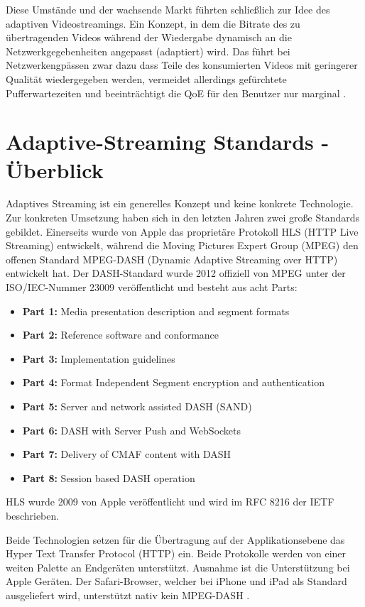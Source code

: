 \documentclass[paper = a4, fontsize = 12pt, parskip = half]{scrartcl} %
\begin{document}
Diese Umstände und der wachsende Markt führten schließlich zur Idee des adaptiven Videostreamings. Ein Konzept, in dem die Bitrate des zu übertragenden Videos während der Wiedergabe dynamisch an die Netzwerkgegebenheiten angepasst (adaptiert) wird. Das führt bei Netzwerkengpässen zwar dazu dass Teile des konsumierten Videos mit geringerer Qualität wiedergegeben werden, vermeidet allerdings gefürchtete Pufferwartezeiten und beeinträchtigt die QoE für den Benutzer nur marginal \cite{seufert_survey_2015}.

\section{Adaptive-Streaming Standards - Überblick}
Adaptives Streaming ist ein generelles Konzept und keine konkrete Technologie. Zur konkreten Umsetzung haben sich in den letzten Jahren zwei große Standards gebildet. Einerseits wurde von Apple das proprietäre Protokoll HLS (HTTP Live Streaming) entwickelt, während die Moving Pictures Expert Group (MPEG) den offenen Standard MPEG-DASH (Dynamic Adaptive Streaming over HTTP) entwickelt hat. Der DASH-Standard wurde 2012 offiziell von MPEG unter der ISO/IEC-Nummer 23009 \cite{international_organization_for_standardization_isoiec_nodate} veröffentlicht und besteht aus acht Parts:

\begin{itemize}
	\item \textbf{Part 1:} Media presentation description and segment formats
	\item \textbf{Part 2:} Reference software and conformance
	\item \textbf{Part 3:} Implementation guidelines
	\item \textbf{Part 4:} Format Independent Segment encryption and authentication
	\item \textbf{Part 5:} Server and network assisted DASH (SAND)
	\item \textbf{Part 6:} DASH with Server Push and WebSockets
	\item \textbf{Part 7:} Delivery of CMAF content with DASH
	\item \textbf{Part 8:} Session based DASH operation
\end{itemize}

HLS wurde 2009 von Apple veröffentlicht und wird im RFC 8216 \cite{pantos_http_nodate} der IETF beschrieben.

Beide Technologien setzen für die Übertragung auf der Applikationsebene das Hyper Text Transfer Protocol (HTTP) ein. Beide Protokolle werden von einer weiten Palette an Endgeräten unterstützt. Ausnahme ist die Unterstützung bei Apple Geräten. Der Safari-Browser, welcher bei iPhone und iPad als Standard ausgeliefert wird, unterstützt nativ kein MPEG-DASH \cite{timmerer_live_2015} .
\end{document}
